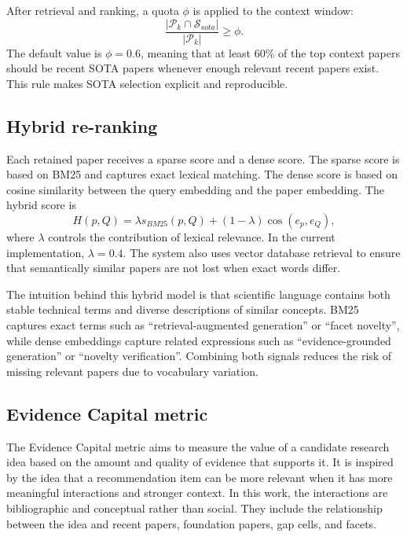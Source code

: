 \documentclass[preprint,12pt]{elsarticle}
\begin{document}
After retrieval and ranking, a quota $\phi$ is applied to the context window:
\begin{equation}
  \frac{|\mathcal{P}_k \cap \mathcal{S}_{sota}|}{|\mathcal{P}_k|} \geq \phi.
\end{equation}
The default value is $\phi=0.6$, meaning that at least 60\% of the top context papers should be recent SOTA papers whenever enough relevant recent papers exist. This rule makes SOTA selection explicit and reproducible.

\subsection{Hybrid re-ranking}

Each retained paper receives a sparse score and a dense score. The sparse score is based on BM25 and captures exact lexical matching. The dense score is based on cosine similarity between the query embedding and the paper embedding. The hybrid score is
\begin{equation}
  H(p,Q) = \lambda s_{BM25}(p,Q) + (1-\lambda) \cos(e_p,e_Q),
\end{equation}
where $\lambda$ controls the contribution of lexical relevance. In the current implementation, $\lambda=0.4$. The system also uses vector database retrieval to ensure that semantically similar papers are not lost when exact words differ.

The intuition behind this hybrid model is that scientific language contains both stable technical terms and diverse descriptions of similar concepts. BM25 captures exact terms such as ``retrieval-augmented generation'' or ``facet novelty'', while dense embeddings capture related expressions such as ``evidence-grounded generation'' or ``novelty verification''. Combining both signals reduces the risk of missing relevant papers due to vocabulary variation.

\subsection{Evidence Capital metric}
\label{subsec:ecmetric}

The Evidence Capital metric aims to measure the value of a candidate research idea based on the amount and quality of evidence that supports it. It is inspired by the idea that a recommendation item can be more relevant when it has more meaningful interactions and stronger context. In this work, the interactions are bibliographic and conceptual rather than social. They include the relationship between the idea and recent papers, foundation papers, gap cells, and facets.
\end{document}
